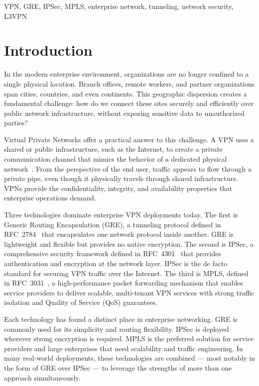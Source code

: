 \documentclass[conference]{IEEEtran}
\begin{document}
\begin{IEEEkeywords}
VPN, GRE, IPSec, MPLS, enterprise network, tunneling, network security, L3VPN
\end{IEEEkeywords}

\section{Introduction}

In the modern enterprise environment, organizations are no longer
confined to a single physical location. Branch offices, remote
workers, and partner organizations span cities, countries, and even
continents. This geographic dispersion creates a fundamental
challenge: how do we connect these sites securely and efficiently
over public network infrastructure, without exposing sensitive data
to unauthorized parties?

Virtual Private Networks offer a practical answer to this challenge.
A VPN uses a shared or public infrastructure, such as the Internet,
to create a private communication channel that mimics the behavior
of a dedicated physical network~\cite{rosu2012}. From the perspective
of the end user, traffic appears to flow through a private pipe, even
though it physically travels through shared infrastructure. VPNs
provide the confidentiality, integrity, and availability properties
that enterprise operations demand.

Three technologies dominate enterprise VPN deployments today. The
first is Generic Routing Encapsulation (GRE), a tunneling protocol
defined in RFC~2784~\cite{rfc2784} that encapsulates one network
protocol inside another. GRE is lightweight and flexible but
provides no native encryption. The second is IPSec, a comprehensive
security framework defined in RFC~4301~\cite{rfc4301} that provides
authentication and encryption at the network layer. IPSec is the de
facto standard for securing VPN traffic over the Internet. The third
is MPLS, defined in RFC~3031~\cite{rfc3031}, a high-performance
packet forwarding mechanism that enables service providers to deliver
scalable, multi-tenant VPN services with strong traffic isolation
and Quality of Service (QoS) guarantees.

Each technology has found a distinct place in enterprise networking.
GRE is commonly used for its simplicity and routing flexibility.
IPSec is deployed wherever strong encryption is required. MPLS is
the preferred solution for service providers and large enterprises
that need scalability and traffic engineering. In many real-world
deployments, these technologies are combined --- most notably in the
form of GRE over IPSec --- to leverage the strengths of more than
one approach simultaneously.
\end{document}

